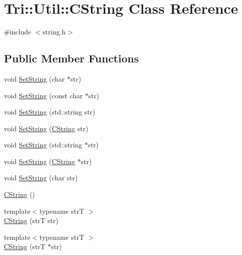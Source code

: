 \hypertarget{class_tri_1_1_util_1_1_c_string}{}\section{Tri\+:\+:Util\+:\+:C\+String Class Reference}
\label{class_tri_1_1_util_1_1_c_string}


{\ttfamily \#include $<$string.\+h$>$}

\subsection*{Public Member Functions}
\begin{DoxyCompactItemize}
\item 
void \hyperlink{class_tri_1_1_util_1_1_c_string_a6be03eb54dd22e8dad8ca64660a6d92b}{Set\+String} (char $\ast$str)
\item 
void \hyperlink{class_tri_1_1_util_1_1_c_string_afc3f742062d046230fc3f2ee1af28c4f}{Set\+String} (const char $\ast$str)
\item 
void \hyperlink{class_tri_1_1_util_1_1_c_string_a7a8cd878987d5e38bcc3c170f6769ef6}{Set\+String} (std\+::string str)
\item 
void \hyperlink{class_tri_1_1_util_1_1_c_string_a5c41d9075832e20636b6854d3d65b59f}{Set\+String} (\hyperlink{class_tri_1_1_util_1_1_c_string}{C\+String} str)
\item 
void \hyperlink{class_tri_1_1_util_1_1_c_string_a2b386e3bf7fe52f06e88dde3237d77c0}{Set\+String} (std\+::string $\ast$str)
\item 
void \hyperlink{class_tri_1_1_util_1_1_c_string_ae2fbcfb9d3415bec24bf3695f543c6fc}{Set\+String} (\hyperlink{class_tri_1_1_util_1_1_c_string}{C\+String} $\ast$str)
\item 
void \hyperlink{class_tri_1_1_util_1_1_c_string_ab5e68d345c97fa29972dc89708939445}{Set\+String} (char str)
\item 
\hyperlink{class_tri_1_1_util_1_1_c_string_acf250c99d34b3a54d29b4238ae34d7c9}{C\+String} ()
\item 
{\footnotesize template$<$typename str\+T $>$ }\\\hyperlink{class_tri_1_1_util_1_1_c_string_ad3ad1b09af3d1c16297acb93aa3b8bf0}{C\+String} (str\+T str)
\item 
{\footnotesize template$<$typename str\+T $>$ }\\\hyperlink{class_tri_1_1_util_1_1_c_string_a1d8de572eb67ea035747170dda6763b7}{C\+String} (str\+T $\ast$str)

\end{DoxyCompactItemize}
